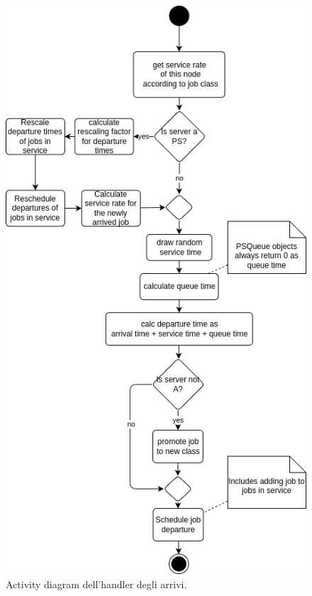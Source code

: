 \begin{figure}
    \centering
    \includegraphics[width=1\linewidth]{figs/diagrams/handle_arrival.drawio.png}
    \caption{Activity diagram dell'handler degli arrivi.}
    \label{fig:handle_arrival}
\end{figure}


